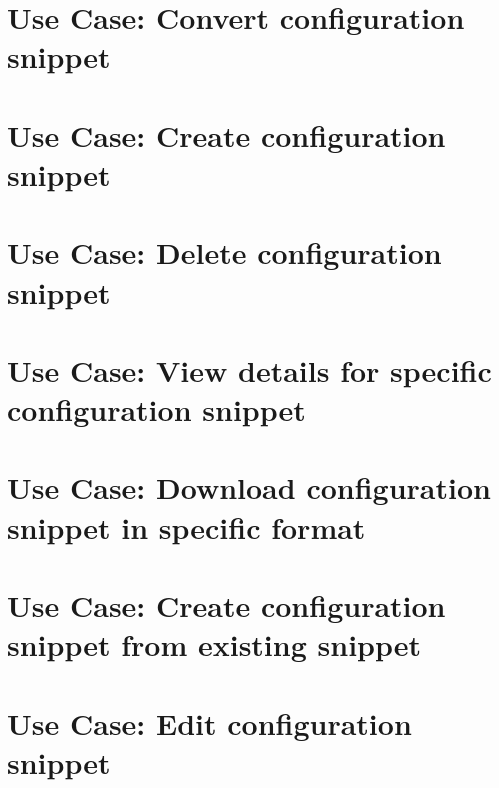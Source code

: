 \documentclass[twoside]{book}
\newcommand{\+}{\discretionary{\mbox{\scriptsize$\hookleftarrow$}}{}{}}
\begin{document}
\chapter{Use Case\+: Convert configuration snippet}
\label{doc_usecases_snippet_sharing_UC_convert_snippet_md}

\chapter{Use Case\+: Create configuration snippet}
\label{doc_usecases_snippet_sharing_UC_create_snippet_md}

\chapter{Use Case\+: Delete configuration snippet}
\label{doc_usecases_snippet_sharing_UC_delete_snippet_md}

\chapter{Use Case\+: View details for specific configuration snippet}
\label{doc_usecases_snippet_sharing_UC_details_snippet_md}

\chapter{Use Case\+: Download configuration snippet in specific format}
\label{doc_usecases_snippet_sharing_UC_download_snippet_md}

\chapter{Use Case\+: Create configuration snippet from existing snippet}
\label{doc_usecases_snippet_sharing_UC_duplicate_snippet_md}

\chapter{Use Case\+: Edit configuration snippet}
\label{doc_usecases_snippet_sharing_UC_edit_snippet_md}

\end{document}
